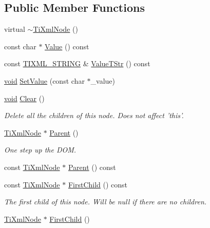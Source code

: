 \subsection*{Public Member Functions}
\begin{DoxyCompactItemize}
\item 
virtual \hyperlink{class_ti_xml_node_aab000e49629822a21f48c7680823429c}{$\sim$\-Ti\-Xml\-Node} ()
\item 
const char $\ast$ \hyperlink{class_ti_xml_node_a77943eb90d12c2892b1337a9f5918b41}{Value} () const 
\item 
const \hyperlink{tinyxml_8h_a92bada05fd84d9a0c9a5bbe53de26887}{T\-I\-X\-M\-L\-\_\-\-S\-T\-R\-I\-N\-G} \& \hyperlink{class_ti_xml_node_a83ece13d2ea66dac66e0b21332229239}{Value\-T\-Str} () const 
\item 
\hyperlink{wglew_8h_aeea6e3dfae3acf232096f57d2d57f084}{void} \hyperlink{class_ti_xml_node_a2a38329ca5d3f28f98ce932b8299ae90}{Set\-Value} (const char $\ast$\-\_\-value)
\item 
\hyperlink{wglew_8h_aeea6e3dfae3acf232096f57d2d57f084}{void} \hyperlink{class_ti_xml_node_a708e7f953df61d4d2d12f73171550a4b}{Clear} ()
\begin{DoxyCompactList}\small\item\em Delete all the children of this node. Does not affect 'this'. \end{DoxyCompactList}\item 
\hyperlink{class_ti_xml_node}{Ti\-Xml\-Node} $\ast$ \hyperlink{class_ti_xml_node_ab643043132ffd794f8602685d34a982e}{Parent} ()
\begin{DoxyCompactList}\small\item\em One step up the D\-O\-M. \end{DoxyCompactList}\item 
const \hyperlink{class_ti_xml_node}{Ti\-Xml\-Node} $\ast$ \hyperlink{class_ti_xml_node_a78878709e53066f06eb4fcbcdd3a5260}{Parent} () const 
\item 
const \hyperlink{class_ti_xml_node}{Ti\-Xml\-Node} $\ast$ \hyperlink{class_ti_xml_node_a44c8eee26bbe2d1b2762038df9dde2f0}{First\-Child} () const 
\begin{DoxyCompactList}\small\item\em The first child of this node. Will be null if there are no children. \end{DoxyCompactList}\item 
\hyperlink{class_ti_xml_node}{Ti\-Xml\-Node} $\ast$ \hyperlink{class_ti_xml_node_a5e97d69b7c0ebd27fb7286be56559b77}{First\-Child} ()

\end{DoxyCompactItemize}
